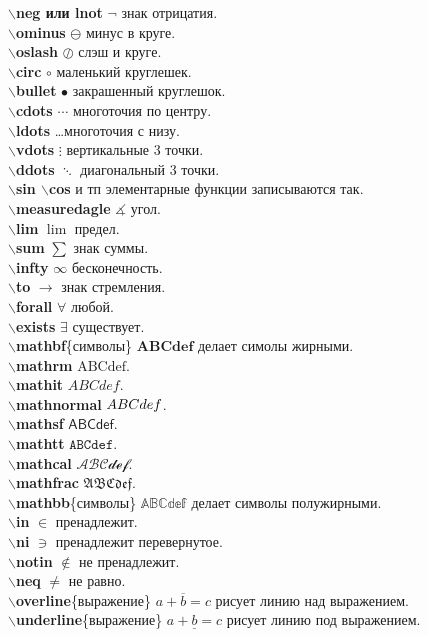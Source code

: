 \documentclass{article}
\newcommand{\bs}{$\backslash$}
\newcommand{\bd}[1]{{\bfseries #1}} %
\newcommand{\bb}[1]{\bd{\bs #1}} %
\begin{document}
\bb{neg или lnot} $\lnot$ знак отрицатия.\\
\bb{ominus} $\ominus$ минус в круге.\\
\bb{oslash} $\oslash$ слэш и круге.\\
\bb{circ} $\circ$ маленький круглешек.\\
\bb{bullet} $\bullet$ закрашенный круглешок.\\
\bb{cdots} $\cdots$ многоточия по центру.\\
\bb{ldots} \ldots многоточия с низу.\\
\bb{vdots} $\vdots$ вертикальные 3 точки.\\
\bb{ddots} $\ddots$ диагональный 3 точки.\\
\bb{sin \bs cos} и тп элементарные функции записываются так.\\
\bb{measuredagle} $\measuredangle$ угол.\\
\bb{lim} $\lim$ предел.\\
\bb{sum} $\sum$ знак суммы.\\
\bb{infty} $\infty$ бесконечность.\\
\bb{to} $\to$ знак стремления.\\
\bb{forall} $\forall$ любой.\\
\bb{exists} $\exists$ существует.\\
\bb{mathbf}\{символы\} $\mathbf{ABCdef}$ делает симолы жирными.\\
\bb{mathrm} $\mathrm{ABCdef}$.\\
\bb{mathit} $\mathit{ABCdef}$.\\
\bb{mathnormal} $\mathnormal{ABCdef}$.\\
\bb{mathsf} $\mathsf{ABCdef}$.\\
\bb{mathtt} $\mathtt{ABCdef}$.\\
\bb{mathcal} $\mathcal{ABCdef}$.\\
\bb{mathfrac} $\mathfrak{ABCdef}$.\\
\bb{mathbb}\{символы\} $\mathbb{ABCdef}$ делает символы полужирными.\\
\bb{in} $\in$ пренадлежит.\\
\bb{ni} $\ni$ пренадлежит перевернутое.\\
\bb{notin} $\notin$ не пренадлежит.\\
\bb{neq} $\neq$ не равно.\\
\bb{overline}\{выражение\} $\overline{a+b=c}$ рисует линию над выражением.\\
\bb{underline}\{выражение\} $\underline{a+b=c}$ рисует линию под выражением.\\
\end{document}
